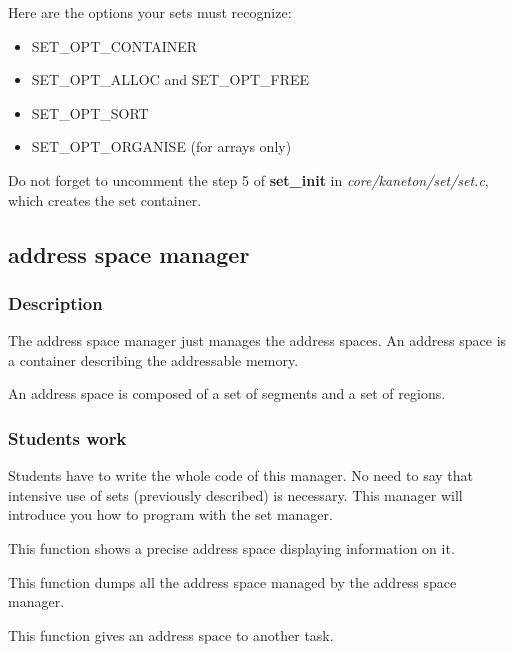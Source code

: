 Here are the options your sets must recognize:

\begin{itemize}
\item SET\_OPT\_CONTAINER
\item SET\_OPT\_ALLOC and SET\_OPT\_FREE
\item SET\_OPT\_SORT
\item SET\_OPT\_ORGANISE (for arrays only)
\end{itemize}

Do  not  forget to  uncomment  the  step  5 of  \textbf{set\_init}  in
\textit{core/kaneton/set/set.c}, which creates the set container.

%
%

\subsection{address space manager}

\subsubsection{Description}

The address space manager just  manages the address spaces. An address
space is a container describing the addressable memory.

An address space is composed of a set of segments and a set of regions.

\subsubsection{Students work}

Students have to write the whole  code of this manager. No need to say
that intensive use of  sets (previously described) is necessary.  This
manager will introduce you how to program with the set manager.


This function shows a precise address space displaying information
on it.


This function dumps all the address space managed by the address
space manager.


This function gives an address space to another task.

